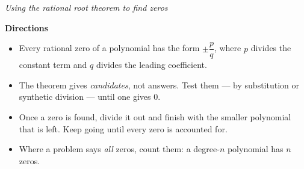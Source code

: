 \documentclass[12pt]{article}
\begin{document}

\begin{center}
{\small\textit{Using the rational root theorem to find zeros}}
\end{center}

\vspace{0.15cm}
\noindent\textbf{Directions}
\begin{itemize}[leftmargin=0.7cm, itemsep=1pt, topsep=3pt]
  \item Every rational zero of a polynomial has the form $\pm \dfrac{p}{q}$,
    where $p$ divides the constant term and $q$ divides the leading coefficient.
  \item The theorem gives \emph{candidates}, not answers. Test them --- by
    substitution or synthetic division --- until one gives $0$.
  \item Once a zero is found, divide it out and finish with the smaller
    polynomial that is left. Keep going until every zero is accounted for.
  \item Where a problem says \emph{all} zeros, count them: a degree-$n$
    polynomial has $n$ zeros.
\end{itemize}

\vspace{0.2cm}





\end{document}

